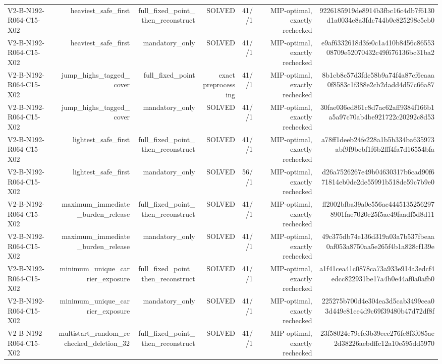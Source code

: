 {\begin{longtable}{lrrrrrr}
V2-B-N192-R064-C15-X02 & heaviest\_safe\_first & full\_fixed\_point\_then\_reconstruct & SOLVED & 41//1 & MIP-optimal, exactly rechecked & 9226185919de8914b3fbc16c4db7f6130d1a0034e8a3fdc744b0c825298c5eb0 \\
V2-B-N192-R064-C15-X02 & heaviest\_safe\_first & mandatory\_only & SOLVED & 41//1 & MIP-optimal, exactly rechecked & e9af6332618d3fe0c1a410b8456c8655308709e52070432c49f676136bc31ba2 \\
V2-B-N192-R064-C15-X02 & jump\_highs\_tagged\_cover & full\_fixed\_point & exact preprocessing & 41//1 & MIP-optimal, exactly rechecked & 8b1cb8c57d3fdc58b9a74f4a87cf6eaaa0f8583c1f388e2cb2dadd4d57c66a87 \\
V2-B-N192-R064-C15-X02 & jump\_highs\_tagged\_cover & mandatory\_only & SOLVED & 41//1 & MIP-optimal, exactly rechecked & 30fae036ed861c8d7ac62aff9384f166b1a5a97c70ab4be921722c20292c8d53 \\
V2-B-N192-R064-C15-X02 & lightest\_safe\_first & full\_fixed\_point\_then\_reconstruct & SOLVED & 41//1 & MIP-optimal, exactly rechecked & a78ff1deeb24fe228a1b5b334ba635973abf9f9bebf1f6b2fff4fa7d16554bfa \\
V2-B-N192-R064-C15-X02 & lightest\_safe\_first & mandatory\_only & SOLVED & 56//1 & MIP-optimal, exactly rechecked & d26a7526267e49b04630317b6cad90f671814eb0de2de55991b518de59c7b9e0 \\
V2-B-N192-R064-C15-X02 & maximum\_immediate\_burden\_release & full\_fixed\_point\_then\_reconstruct & SOLVED & 41//1 & MIP-optimal, exactly rechecked & ff2002bfba39a0e556ac44451352562978901fae7020c25f5ae49faadf5d8d11 \\
V2-B-N192-R064-C15-X02 & maximum\_immediate\_burden\_release & mandatory\_only & SOLVED & 41//1 & MIP-optimal, exactly rechecked & 49c375db74e136d319a03a7b537fbeaa0af053a8750aa5e265f4b1a828cf139e \\
V2-B-N192-R064-C15-X02 & minimum\_unique\_carrier\_exposure & full\_fixed\_point\_then\_reconstruct & SOLVED & 41//1 & MIP-optimal, exactly rechecked & a1f41cea41c0878ca73a933e914a3edcf4edcc822931be17a4b0e44af0a0afb0 \\
V2-B-N192-R064-C15-X02 & minimum\_unique\_carrier\_exposure & mandatory\_only & SOLVED & 41//1 & MIP-optimal, exactly rechecked & 225275b700d4e304ea3d5cab3499cea03d449e81ce4d9c69f39480b47d72df8f \\
V2-B-N192-R064-C15-X02 & multistart\_random\_rechecked\_deletion\_32 & full\_fixed\_point\_then\_reconstruct & SOLVED & 41//1 & MIP-optimal, exactly rechecked & 23f58024e79efe3b39eec276fe8f3f085ae2d38226aebdffc12a10e595dd5970 \\

\end{longtable}}
